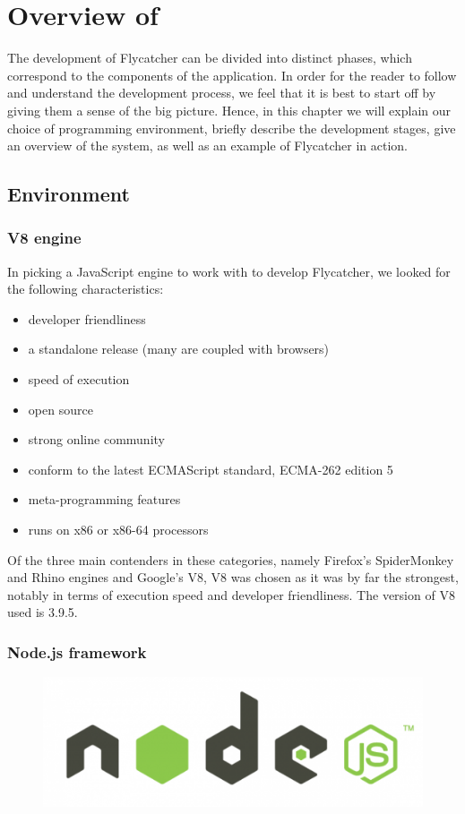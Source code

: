 \chapter{Overview of \textsf{}}
The development of Flycatcher can be divided into distinct phases, which correspond to the components of the application. In order for the reader to follow and understand the development process, we feel that it is best to start off by giving them a sense of the big picture. Hence, in this chapter we will explain our choice of programming environment, briefly describe the development stages, give an overview of the system, as well as an example of \textsf{Flycatcher} in action.

\section{Environment}
\subsection{V8 engine}

In picking a JavaScript engine to work with to develop \textsf{Flycatcher}, we looked for the following characteristics:
\begin{itemize}
   \item developer friendliness
   \item a standalone release (many are coupled with browsers)
   \item speed of execution
   \item open source
   \item strong online community
   \item conform to the latest ECMAScript standard, ECMA-262 edition 5
   \item meta-programming features
   \item runs on x86 or x86-64 processors
\end{itemize}

Of the three main contenders in these categories, namely Firefox's SpiderMonkey and Rhino engines and Google's V8, V8 was chosen as it was by far the strongest, notably in terms of execution speed and developer friendliness. The version of V8 used is 3.9.5.

\subsection{Node.js framework}
\begin{figure}[h]
\centering
\includegraphics[scale=0.2]{./components/chapter3/nodejs.png}
\end{figure}

